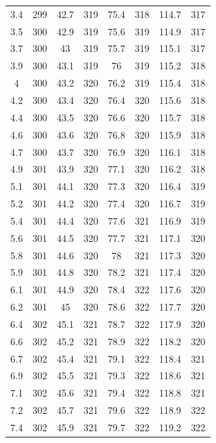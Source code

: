 \documentclass[12pt]{ctexart}
\numberwithin{equation}{section}
\begin{document}
\begin{longtable}{cc|cc|cc|cc}
3.4  &  299  &  42.7  &  319  &  75.4  &  318  &  114.7  &  317  \\
3.5  &  300  &  42.9  &  319  &  75.6  &  319  &  114.9  &  317  \\
3.7  &  300  &  43  &  319  &  75.7  &  319  &  115.1  &  317  \\
3.9  &  300  &  43.1  &  319  &  76  &  319  &  115.2  &  318  \\
4  &  300  &  43.2  &  320  &  76.2  &  319  &  115.4  &  318  \\
4.2  &  300  &  43.4  &  320  &  76.4  &  320  &  115.6  &  318  \\
4.4  &  300  &  43.5  &  320  &  76.6  &  320  &  115.7  &  318  \\
4.6  &  300  &  43.6  &  320  &  76.8  &  320  &  115.9  &  318  \\
4.7  &  300  &  43.7  &  320  &  76.9  &  320  &  116.1  &  318  \\
4.9  &  301  &  43.9  &  320  &  77.1  &  320  &  116.2  &  318  \\
5.1  &  301  &  44.1  &  320  &  77.3  &  320  &  116.4  &  319  \\
5.2  &  301  &  44.2  &  320  &  77.4  &  320  &  116.7  &  319  \\
5.4  &  301  &  44.4  &  320  &  77.6  &  321  &  116.9  &  319  \\
5.6  &  301  &  44.5  &  320  &  77.7  &  321  &  117.1  &  320  \\
5.8  &  301  &  44.6  &  320  &  78  &  321  &  117.3  &  320  \\
5.9  &  301  &  44.8  &  320  &  78.2  &  321  &  117.4  &  320  \\
6.1  &  301  &  44.9  &  320  &  78.4  &  322  &  117.6  &  320  \\
6.2  &  301  &  45  &  320  &  78.6  &  322  &  117.7  &  320  \\
6.4  &  302  &  45.1  &  321  &  78.7  &  322  &  117.9  &  320  \\
6.6  &  302  &  45.2  &  321  &  78.9  &  322  &  118.2  &  320  \\
6.7  &  302  &  45.4  &  321  &  79.1  &  322  &  118.4  &  321  \\
6.9  &  302  &  45.5  &  321  &  79.3  &  322  &  118.6  &  321  \\
7.1  &  302  &  45.6  &  321  &  79.4  &  322  &  118.8  &  321  \\
7.2  &  302  &  45.7  &  321  &  79.6  &  322  &  118.9  &  322  \\
7.4  &  302  &  45.9  &  321  &  79.7  &  322  &  119.2  &  322  \\

\end{longtable}
\end{document}
